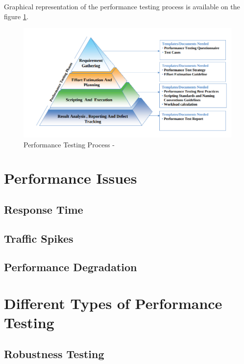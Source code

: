 Graphical representation of the performance testing process is available on the figure \ref{fig:performace_testing_process}. 

\begin{figure}[H]
  \centering
  \includegraphics[width=13cm]{obrazky-figures/performance_process_pyramid.png}
  \caption{Performance Testing Process - }
  \label{fig:performace_testing_process}
\end{figure}

\section{Performance Issues}
\label{Performance Issues}

\subsection{Response Time}

\subsection{Traffic Spikes}

\subsection{Performance Degradation}

\section{Different Types of Performance Testing}
\label{Different Types of Performance Testing}

\subsection*{Robustness Testing}

